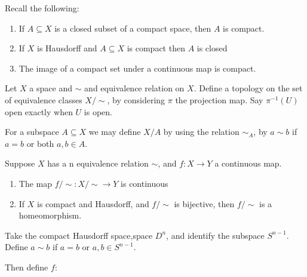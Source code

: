 \documentclass{article}
\begin{document}
\begin{thm}
    Recall the following:
    \begin{enumerate}
        \item If $ A\subseteq X $ is a closed subset of a compact space, then $ A  $ is compact.
        \item If $ X $ is Hausdorff and $ A\subseteq X $ is compact then $ A $ is closed
        \item The image of a compact set under a continuous map is compact.
    \end{enumerate}

\end{thm}
    \begin{defn}
        Let $ X  $ a space and $ \sim   $ and equivalence relation on $ X $. Define a topology on the set of equivalence classes $ X / \sim  $, by considering $ \pi $ the projection map. Say $ \pi^{-1}(U) $ open exactly when $ U $ is open.

        For a subspace $ A \subseteq X $ we may define $ X / A $ by using the relation $ \sim _A $, by $ a\sim b $ if $ a=b $ or both $ a,b\in A $.
    \end{defn}

    \begin{lem}
        Suppose $ X $ has a n equivalence relation $\sim$, and $ f:X\to Y  $ a continuous map.
        \begin{enumerate}
            \item The map $ f/ \sim :X / \sim \to Y $ is continuous
            \item If $ X $ is compact and Hausdorff, and $ f/ \sim $ is bijective, then $ f/ \sim $ is a homeomorphism.
        \end{enumerate}
    \end{lem}

    \newpage
    \begin{exmp}
        Take the compact Hausdorff space,space $ D^{n} $,  and identify the subspace $ S^{n-1} $. Define $ a\sim b $ if $ a=b $ or $ a,b \in S^{n-1}$.

        Then define $ f: $
    \end{exmp}
\end{document}
